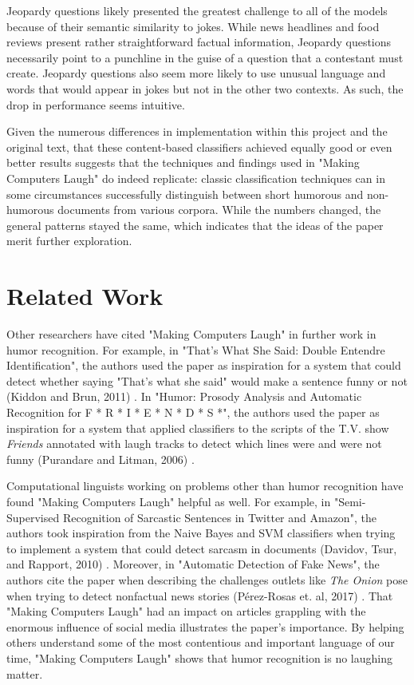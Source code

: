 \documentclass[11pt,a4paper]{article}
\begin{document}
Jeopardy questions likely presented the greatest challenge to all of the models because of their semantic similarity to jokes. While news headlines and food reviews present rather straightforward factual information, Jeopardy questions necessarily point to a punchline in the guise of a question that a contestant must create. Jeopardy questions also seem more likely to use unusual language and words that would appear in jokes but not in the other two contexts. As such, the drop in performance seems intuitive.

Given the numerous differences in implementation within this project and the original text, that these content-based classifiers achieved equally good or even better results suggests that the techniques and findings used in "Making Computers Laugh" do indeed replicate: classic classification techniques can in some circumstances successfully distinguish between short humorous and non-humorous documents from various corpora. While the numbers changed, the general patterns stayed the same, which indicates that the ideas of the paper merit further exploration.

\section{Related Work}

Other researchers have cited "Making Computers Laugh" in further work in humor recognition. For example, in "That's What She Said: Double Entendre Identification", the authors used the paper as inspiration for a system that could detect whether saying "That's what she said" would make a sentence funny or not (Kiddon and Brun, 2011) \cite{kiddon2011s}. In "Humor: Prosody Analysis and Automatic Recognition for F * R * I * E * N * D * S *", the authors used the paper as inspiration for a system that applied classifiers to the scripts of the T.V. show \emph{Friends} annotated with laugh tracks to detect which lines were and were not funny (Purandare and Litman, 2006) \cite{purandare2006humor}.

Computational linguists working on problems other than humor recognition have found "Making Computers Laugh" helpful as well. For example, in "Semi-Supervised Recognition of Sarcastic Sentences in Twitter and Amazon", the authors took inspiration from the Naive Bayes and SVM classifiers when trying to implement a system that could detect sarcasm in documents (Davidov, Tsur, and Rapport, 2010) \cite{davidov2010semi}. Moreover, in "Automatic Detection of Fake News", the authors cite the paper when describing the challenges outlets like \emph{The Onion} pose when trying to detect nonfactual news stories (P{\'e}rez-Rosas et. al, 2017) \cite{perez2017automatic}. That "Making Computers Laugh" had an impact on articles grappling with the enormous influence of social media illustrates the paper's importance. By helping others understand some of the most contentious and important language of our time, "Making Computers Laugh" shows that humor recognition is no laughing matter.



\end{document}
